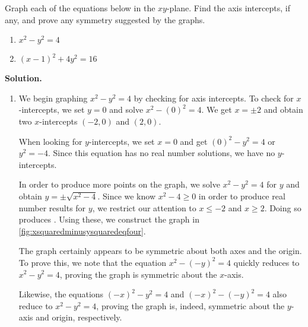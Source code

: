 \begin{ex}  \label{graphssymmex} Graph each of the equations below in the $xy$-plane.  Find the axis intercepts, if any,  and prove any symmetry suggested by the graphs.  

\begin{multicols}{2}

\begin{enumerate}

\item $x^2-y^2 = 4$

\item $(x-1)^2+4y^2 = 16$

\end{enumerate}

\end{multicols}


{\bf Solution.}

\begin{enumerate}

\item We begin graphing $x^2-y^2 = 4$ by checking for axis intercepts.  To check for $x$-intercepts, we set $y=0$ and solve $x^2 - (0)^2 = 4$.  We get $x = \pm 2$ and obtain two $x$-intercepts $(-2,0)$ and $(2,0)$.  


When looking for $y$-intercepts, we set $x=0$ and get $(0)^2 - y^2 = 4$ or $y^2 = -4$.  Since this equation has no real number solutions, we have no $y$-intercepts.  


		In order to produce more points on the graph, we solve $x^2-y^2 = 4$ for $y$ and obtain $y = \pm \sqrt{x^2-4}$.  Since we know $x^2-4 \geq 0$ in order to produce real number results for $y$, we restrict our attention to $x \leq -2$ and $x \geq 2$.  Doing so produces .  Using these, we construct the graph in \autoref{fig:xsquaredminusysquaredeqfour}.


The graph certainly appears to be symmetric about both axes and the origin.  To prove this, we note that the equation $x^2-(-y)^2 = 4$ quickly reduces to $x^2-y^2 = 4$, proving the graph is symmetric about the $x$-axis. 


 Likewise, the equations $(-x)^2-y^2 = 4$ and $(-x)^2-(-y)^2 = 4$ also reduce to $x^2-y^2 = 4$, proving the graph is, indeed, symmetric about the $y$-axis and origin, respectively.

\begin{figure}

\begin{minipage}[b]{0.5\textwidth}
\begin{center}


\end{center}
\end{minipage}
\end{figure}
\end{enumerate}
\end{ex}
